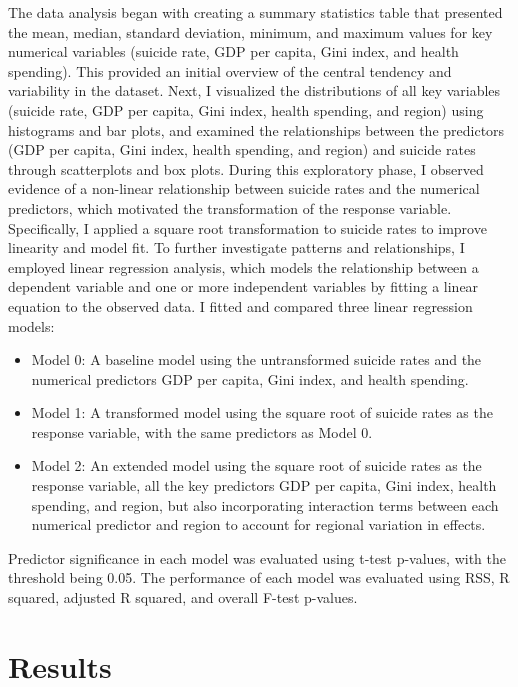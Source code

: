 \documentclass[
]{article}
\begin{document}
The data analysis began with creating a summary statistics table that
presented the mean, median, standard deviation, minimum, and maximum
values for key numerical variables (suicide rate, GDP per capita, Gini
index, and health spending). This provided an initial overview of the
central tendency and variability in the dataset. Next, I visualized the
distributions of all key variables (suicide rate, GDP per capita, Gini
index, health spending, and region) using histograms and bar plots, and
examined the relationships between the predictors (GDP per capita, Gini
index, health spending, and region) and suicide rates through
scatterplots and box plots. During this exploratory phase, I observed
evidence of a non-linear relationship between suicide rates and the
numerical predictors, which motivated the transformation of the response
variable. Specifically, I applied a square root transformation to
suicide rates to improve linearity and model fit. To further investigate
patterns and relationships, I employed linear regression analysis, which
models the relationship between a dependent variable and one or more
independent variables by fitting a linear equation to the observed data.
I fitted and compared three linear regression models:

\begin{itemize}
\item
  Model 0: A baseline model using the untransformed suicide rates and
  the numerical predictors GDP per capita, Gini index, and health
  spending.
\item
  Model 1: A transformed model using the square root of suicide rates as
  the response variable, with the same predictors as Model 0.
\item
  Model 2: An extended model using the square root of suicide rates as
  the response variable, all the key predictors GDP per capita, Gini
  index, health spending, and region, but also incorporating interaction
  terms between each numerical predictor and region to account for
  regional variation in effects.
\end{itemize}

Predictor significance in each model was evaluated using t-test
p-values, with the threshold being 0.05. The performance of each model
was evaluated using RSS, R squared, adjusted R squared, and overall
F-test p-values.

\hfill\break
\hfill\break

\section{Results}\label{results}
\end{document}
